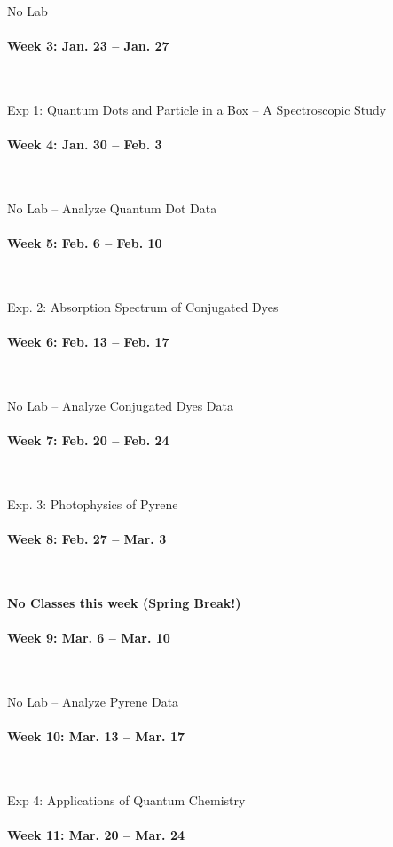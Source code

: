 \documentclass[12pt, letterpaper]{article}
\begin{document}
No Lab

\paragraph{Week 3: Jan. 23 -- Jan. 27}~

Exp 1: Quantum Dots and Particle in a Box – A Spectroscopic Study

\paragraph{Week 4: Jan. 30 -- Feb. 3}~

No Lab -- Analyze Quantum Dot Data
\paragraph{Week 5: Feb. 6 -- Feb. 10}~


Exp. 2: Absorption Spectrum of Conjugated Dyes

\paragraph{Week 6: Feb. 13 -- Feb. 17}~

No Lab -- Analyze Conjugated Dyes Data

\paragraph{Week 7: Feb. 20 -- Feb. 24}~

Exp. 3: Photophysics of Pyrene

\paragraph{Week 8: Feb. 27 -- Mar. 3}~

\textbf{No Classes this week (Spring Break!)}

\paragraph{Week 9: Mar. 6 -- Mar. 10}~

No Lab -- Analyze Pyrene Data

\paragraph{Week 10: Mar. 13 -- Mar. 17}~

Exp 4: Applications of Quantum Chemistry

\paragraph{Week 11: Mar. 20 -- Mar. 24}~
\end{document}
